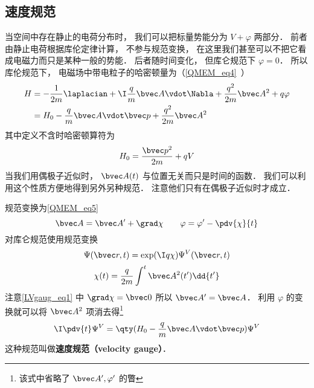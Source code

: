 
\begin{issues}
\issueDraft
\end{issues}


\subsection{速度规范}
当空间中存在静止的电荷分布时， 我们可以把标量势能分为 $V + \varphi$ 两部分． 前者由静止电荷根据库伦定律计算， 不参与规范变换， 在这里我们甚至可以不把它看成电磁力而只是某种一般的势能． 后者随时间变化， 但库仑规范下 $\varphi = 0$． 所以库伦规范下， 电磁场中带电粒子的哈密顿量为（\autoref{QMEM_eq4}~）
\begin{equation}
\begin{aligned}
H &= -\frac{1}{2m} \laplacian + \I \frac{q}{m} \bvec A \vdot \Nabla + \frac{q^2}{2m} \bvec A^2 + q\varphi\\
&= H_0 - \frac{q}{m} \bvec A \vdot \bvec p + \frac{q^2}{2m} \bvec A^2
\end{aligned}
\end{equation}
其中定义不含时哈密顿算符为
\begin{equation}
H_0 = \frac{\bvec p^2}{2m} + qV
\end{equation}
当我们用偶极子近似时， $\bvec A(t)$ 与位置无关而只是时间的函数． 我们可以利用这个性质方便地得到另外另种规范． 注意他们只有在偶极子近似时才成立．

规范变换为\autoref{QMEM_eq5}~
\begin{equation}\label{LVgaug_eq1}
\bvec A = \bvec A' + \grad \chi
\qquad
\varphi = \varphi' - \pdv{\chi}{t}
\end{equation}
对库仑规范使用规范变换
\begin{equation}\label{LVgaug_eq3}
\Psi(\bvec r, t) = \exp(\I q\chi)\Psi^V(\bvec r, t)
\end{equation}
\begin{equation}\label{LVgaug_eq4}
\chi(t) = \frac{q}{2m} \int^t \bvec A^2(t') \dd{t'}
\end{equation}
注意\autoref{LVgaug_eq1} 中 $\grad \chi = \bvec 0$ 所以 $\bvec A' = \bvec A$． 利用 $\varphi$ 的变换就可以将 $\bvec A^2$ 项消去得\footnote{该式中省略了 $\bvec A', \varphi'$ 的瞥}
\begin{equation}
\I \pdv{t} \Psi^V = \qty(H_0 - \frac{q}{m} \bvec A \vdot \bvec p) \Psi^V
\end{equation}
这种规范叫做\textbf{速度规范（velocity gauge）}．


